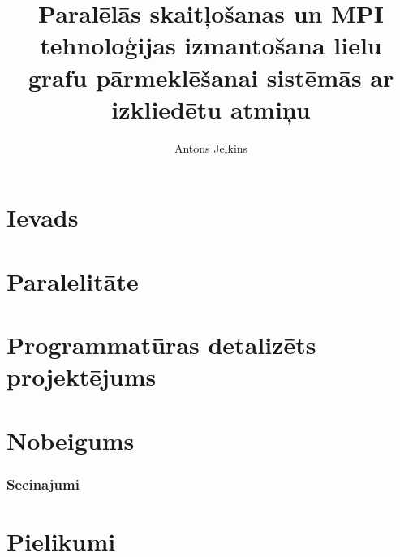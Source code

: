 \documentclass[master-thesis]{rtu-thesis}
\title{Paralēlās skaitļošanas un MPI tehnoloģijas izmantošana lielu
       grafu pārmeklēšanai sistēmās ar izkliedētu atmiņu}
\author{Antons Jeļkins}
\begin{document}
\frontmatter
\maketitle
\tableofcontents


\mainmatter
\part{Ievads}


\part{Paralelitāte}













\part{Programmatūras detalizēts projektējums}







\part{Nobeigums}
\section{Secinājumi}

\listoffigures
\listoftables



\part{Pielikumi}\appendix



\end{document}
